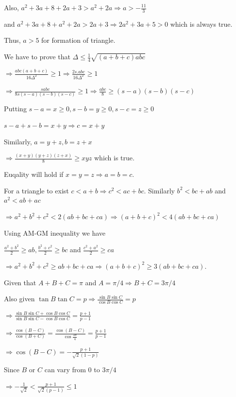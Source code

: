   Also, $a^2 + 3a + 8  + 2a + 3 > a^2 + 2a \Rightarrow a > -\frac{11}{3}$

  and $a^2 + 3a + 8 + a^2 + 2a > 2a + 3 \Rightarrow 2a^2 + 3a + 5 > 0$ which is always true.

  Thus, $a > 5$ for formation of triangle.
\item We have to prove that $\Delta\le \frac{1}{4}\sqrt{(a + b + c)abc}$

  $\Rightarrow \frac{abc(a + b + c)}{16\Delta^2}\ge 1\Rightarrow \frac{2s.abc}{16\Delta^2}\ge 1$

  $\Rightarrow \frac{sabc}{8s(s - a)(s - b)(s - c)}\ge 1 \Rightarrow \frac{abc}{8}\ge (s - a)(s - b)(s - c)$

  Putting $s - a = x\ge 0, s - b = y\ge 0, s - c = z\ge 0$

  $s - a + s - b = x + y \Rightarrow c = x + y$

  Similarly, $a = y + z, b = z + x$

  $\Rightarrow \frac{(x + y)(y + z)(z + x)}{8}\ge xyz$ which is true.

  Euqality will hold if $x = y = z \Rightarrow a = b = c$.
\item For a triangle to exist $c < a + b \Rightarrow c^2 < ac + bc$. Similarly $b^2 < bc + ab$ and $a^2 < ab
  + ac$

  $\Rightarrow a^2 + b^2 + c^2 < 2(ab + bc + ca)\Rightarrow (a + b + c)^2 < 4(ab + bc + ca)$

  Using AM-GM inequality we have

  $\frac{a^2 + b^2}{2}\ge ab, \frac{b^2 + c^2}{2}\ge bc$ and $\frac{c^2 + a^2}{2}\ge ca$

  $\Rightarrow a^2 + b^2 + c^2\ge ab + bc + ca\Rightarrow (a + b + c)^2\ge 3(ab + bc + ca)$.
\item Given that $A + B + C = \pi$ and $A = \pi/4\Rightarrow B + C = 3\pi/4$

  Also given $\tan B\tan C = p \Rightarrow \frac{\sin B\sin C}{\cos B\cos C} = p$

  $\Rightarrow \frac{\sin B\sin C + \cos B\cos C}{\sin B\sin C - \cos B\cos C} = \frac{p + 1}{p - 1}$

  $\Rightarrow \frac{\cos(B - C)}{\cos(B + C)} = \frac{\cos(B - C)}{\cos\frac{3\pi}{4}} = \frac{p + 1}{p -
    1}$

  $\Rightarrow \cos(B - C) = -\frac{p + 1}{\sqrt{2}(1 - p)}$

  Since $B$ or $C$ can vary from $0$ to $3\pi/4$

  $\Rightarrow -\frac{1}{\sqrt{2}}< \frac{p + 1}{\sqrt{2}(p - 1)} \le 1$

